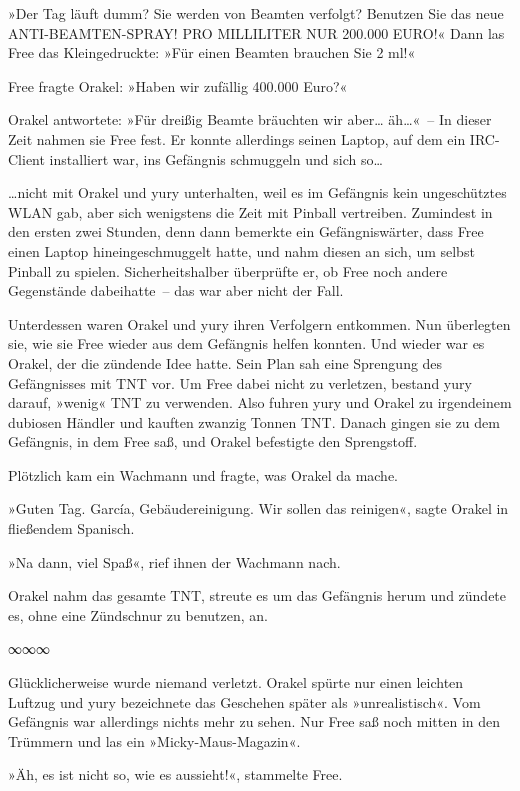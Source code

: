 »Der Tag läuft dumm? Sie werden von Beamten verfolgt? Benutzen Sie das neue ANTI-BEAMTEN-SPRAY! PRO MILLILITER NUR 200.000 EURO!« Dann las Free das Kleingedruckte: »Für einen Beamten brauchen Sie 2 ml!«

Free fragte Orakel: »Haben wir zufällig 400.000 Euro?«

Orakel antwortete: »Für dreißig Beamte bräuchten wir aber… äh…«~– In dieser Zeit nahmen sie Free fest. Er konnte allerdings seinen Laptop, auf dem ein IRC-Client installiert war, ins Gefängnis schmuggeln und sich so…

…nicht mit Orakel und yury unterhalten, weil es im Gefängnis kein ungeschütztes WLAN gab, aber sich wenigstens die Zeit mit Pinball vertreiben. Zumindest in den ersten zwei Stunden, denn dann bemerkte ein Gefängniswärter, dass Free einen Laptop hineingeschmuggelt hatte, und nahm diesen an sich, um selbst Pinball zu spielen. Sicherheitshalber überprüfte er, ob Free noch andere Gegenstände dabeihatte~– das war aber nicht der Fall.

Unterdessen waren Orakel und yury ihren Verfolgern entkommen. Nun überlegten sie, wie sie Free wieder aus dem Gefängnis helfen konnten. Und wieder war es Orakel, der die zündende Idee hatte. Sein Plan sah eine Sprengung des Gefängnisses mit TNT vor. Um Free dabei nicht zu verletzen, bestand yury darauf, »wenig« TNT zu verwenden. Also fuhren yury und Orakel zu irgendeinem dubiosen Händler und kauften zwanzig Tonnen TNT. Danach gingen sie zu dem Gefängnis, in dem Free saß, und Orakel befestigte den Sprengstoff.

Plötzlich kam ein Wachmann und fragte, was Orakel da mache.

»Guten Tag. García, Gebäudereinigung. Wir sollen das reinigen«, sagte Orakel in fließendem Spanisch.

»Na dann, viel Spaß«, rief ihnen der Wachmann nach.

Orakel nahm das gesamte TNT, streute es um das Gefängnis herum und zündete es, ohne eine Zündschnur zu benutzen, an.

\begin{center}
    ∞∞∞
\end{center}

Glücklicherweise wurde niemand verletzt. Orakel spürte nur einen leichten Luftzug und yury bezeichnete das Geschehen später als »unrealistisch«. Vom Gefängnis war allerdings nichts mehr zu sehen. Nur Free saß noch mitten in den Trümmern und las ein »Micky-Maus-Magazin«.

»Äh, es ist nicht so, wie es aussieht!«, stammelte Free.

